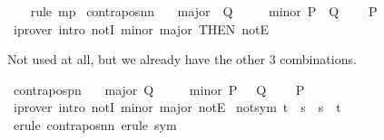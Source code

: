 \begin{isabellebody}
%
\isadelimproof
\ \ %
\endisadelimproof
%
\isatagproof
{}\isamarkupfalse%
\ {\isacharparenleft}{\kern0pt}rule\ mp{\isacharparenright}{\kern0pt}%
\endisatagproof
{\isafoldproof}%
%
\isadelimproof
\isanewline
%
\endisadelimproof
\isanewline
{}\isamarkupfalse%
\ contrapos{\isacharunderscore}{\kern0pt}nn{\isacharcolon}{\kern0pt}\isanewline
\ \ \ major{\isacharcolon}{\kern0pt}\ {\isachardoublequoteopen}{\isasymnot}\ Q{\isachardoublequoteclose}\isanewline
\ \ \ \ \ minor{\isacharcolon}{\kern0pt}\ {\isachardoublequoteopen}P\ {\isasymLongrightarrow}\ Q{\isachardoublequoteclose}\isanewline
\ \ \ {\isachardoublequoteopen}{\isasymnot}\ P{\isachardoublequoteclose}\isanewline
%
\isadelimproof
\ \ %
\endisadelimproof
%
\isatagproof
{}\isamarkupfalse%
\ {\isacharparenleft}{\kern0pt}iprover\ intro{\isacharcolon}{\kern0pt}\ notI\ minor\ major\ {\isacharbrackleft}{\kern0pt}THEN\ notE{\isacharbrackright}{\kern0pt}{\isacharparenright}{\kern0pt}%
\endisatagproof
{\isafoldproof}%
%
\isadelimproof
%
\endisadelimproof
%
\begin{isamarkuptext}%
Not used at all, but we already have the other 3 combinations.%
\end{isamarkuptext}\isamarkuptrue%
\isamarkupfalse%
\ contrapos{\isacharunderscore}{\kern0pt}pn{\isacharcolon}{\kern0pt}\isanewline
\ \ \ major{\isacharcolon}{\kern0pt}\ {\isachardoublequoteopen}Q{\isachardoublequoteclose}\isanewline
\ \ \ \ \ minor{\isacharcolon}{\kern0pt}\ {\isachardoublequoteopen}P\ {\isasymLongrightarrow}\ {\isasymnot}\ Q{\isachardoublequoteclose}\isanewline
\ \ \ {\isachardoublequoteopen}{\isasymnot}\ P{\isachardoublequoteclose}\isanewline
%
\isadelimproof
\ \ %
\endisadelimproof
%
\isatagproof
{}\isamarkupfalse%
\ {\isacharparenleft}{\kern0pt}iprover\ intro{\isacharcolon}{\kern0pt}\ notI\ minor\ major\ notE{\isacharparenright}{\kern0pt}%
\endisatagproof
{\isafoldproof}%
%
\isadelimproof
\isanewline
%
\endisadelimproof
\isanewline
{}\isamarkupfalse%
\ not{\isacharunderscore}{\kern0pt}sym{\isacharcolon}{\kern0pt}\ {\isachardoublequoteopen}t\ {\isasymnoteq}\ s\ {\isasymLongrightarrow}\ s\ {\isasymnoteq}\ t{\isachardoublequoteclose}\isanewline
%
\isadelimproof
\ \ %
\endisadelimproof
%
\isatagproof
{}\isamarkupfalse%
\ {\isacharparenleft}{\kern0pt}erule\ contrapos{\isacharunderscore}{\kern0pt}nn{\isacharparenright}{\kern0pt}\ {\isacharparenleft}{\kern0pt}erule\ sym{\isacharparenright}{\kern0pt}%

\end{isabellebody}
